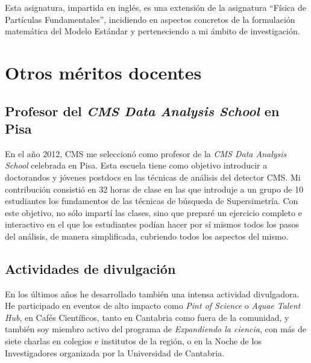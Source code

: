 Esta asignatura, impartida en inglés, es una extensión de la asignatura “Física de Partículas Fundamentales”, incidiendo en aspectos concretos de la formulación matemática del Modelo Estándar y perteneciendo a mi ámbito de investigación.

\section{Otros méritos docentes}

\subsection{Profesor del \emph{CMS Data Analysis School} en Pisa}

En el año 2012, CMS me seleccionó como profesor de la \emph{CMS Data Analysis School} celebrada en Pisa. Esta escuela tiene como objetivo introducir a doctorandos y jóvenes postdocs en las técnicas de análisis del detector CMS. Mi contribución consistió en 32 horas de clase en las que introduje a un grupo de 10 estudiantes los fundamentos de las técnicas de búsqueda de Supersimetría. Con este objetivo, no sólo impartí las clases, sino que preparé un ejercicio completo e interactivo en el que los estudiantes podían hacer por sí mismos todos los pasos del análisis, de manera simplificada, cubriendo todos los aspectos del mismo.

\subsection{Actividades de divulgación}

En los últimos años he desarrollado también una intensa actividad divulgadora. He participado en eventos de alto impacto como \emph{Pint of Science} o \emph{Aquae Talent Hub}, en Cafés Científicos, tanto en Cantabria como fuera de la comunidad, y también soy miembro activo del programa de \emph{Expandiendo la ciencia}, con más de siete charlas en colegios e institutos de la región, o en la Noche de los Investigadores organizada por la Universidad de Cantabria.



